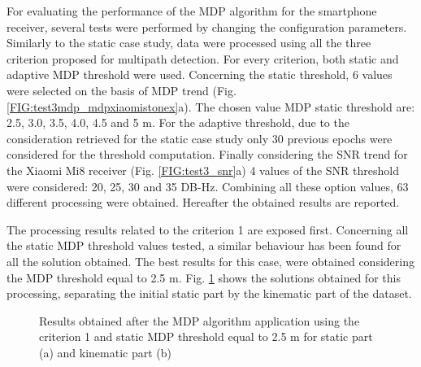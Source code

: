 For evaluating the performance of the MDP algorithm for the smartphone receiver, several tests were performed by changing the configuration parameters. Similarly to the static case study, data were processed using all the three criterion proposed for multipath detection. For every criterion, both static and adaptive MDP threshold were used. Concerning the static threshold, 6 values were selected on the basis of MDP trend (Fig. \ref{FIG:test3mdp_mdpxiaomistonex}a). The chosen value MDP static threshold are: 2.5, 3.0, 3.5, 4.0, 4.5 and 5 m. For the adaptive threshold, due to the consideration retrieved for the static case study only 30 previous epochs were considered for the threshold computation. Finally considering the SNR trend for the Xiaomi Mi8 receiver (Fig. \ref{FIG:test3_snr}a) 4 values of the SNR threshold were considered: 20, 25, 30 and 35 DB-Hz. Combining all these option values, 63 different processing were obtained. Hereafter the obtained results are reported.

The processing results related to the criterion 1 are exposed first. Concerning all the static MDP threshold values tested, a similar behaviour has been found for all the solution obtained. The best results for this case, were obtained considering the MDP threshold equal to 2.5 m.
Fig. \ref{FIG:test3mdp_crit1mdpstatic} shows the solutions obtained for this processing, separating the initial static part by the kinematic part of the dataset.

\begin{figure}[H] 
	\centering
    \caption{Results obtained after the MDP algorithm application using the criterion 1 and static MDP threshold equal to 2.5 m for static part (a) and kinematic part (b)}
    \label{fig:foobar}
	\label{FIG:test3mdp_crit1mdpstatic} 
\end{figure}

